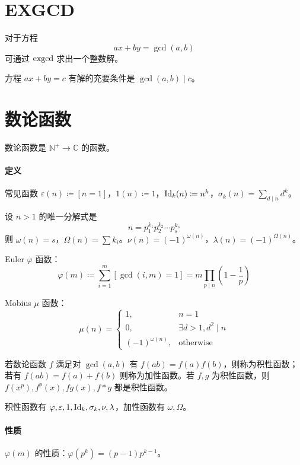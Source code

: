 \documentclass{probook}
\begin{document}
\begin{multicols}{2}


\section{EXGCD}

对于方程 
\[ax+by=\gcd(a,b)\]
可通过 $\rm exgcd$ 求出一个整数解。



方程 $ax+by=c$ 有解的充要条件是 $\gcd(a,b) \mid c$。



\section{数论函数}

数论函数是 $\mathbb{N}^+ \to \mathbb{C}$ 的函数。

\paragraph{定义}
常见函数 $\varepsilon(n) \coloneqq [n=1]$，$1(n) \coloneqq 1$，$\operatorname{Id}_k(n) \coloneqq n^k$，$\sigma_k(n) = \sum\limits_{d \mid n} d^k$。

设 $n > 1$ 的唯一分解式是
\[ n = p_1^{k_1}p_2^{k_2}\cdots p_s^{k_s} \]
则 $\omega(n) = s$，$\Omega(n) = \sum k_i$。$\nu(n) = (-1)^{\omega(n)}$，$\lambda(n) = (-1)^{\Omega(n)}$。

Euler $\varphi$ 函数：
\[ \varphi(m) \coloneqq \sum_{i=1}^m [\gcd(i,m) = 1] = m \prod_{p \mid n}\left( 1-\frac{1}{p} \right) \]

Mobius $\mu$ 函数：
\[ \mu(n) = \begin{cases}
    1, &n=1\\
    0, &\exists d > 1, d^2 \mid n\\
    (-1)^{\omega(n)}, &\text{otherwise}
\end{cases} \]

若数论函数 $f$ 满足对 $\gcd(a,b)$ 有 $f(ab) = f(a)f(b)$，则称为积性函数；若有 $f(ab) = f(a) + f(b)$ 则称为加性函数。若 $f,g$ 为积性函数，则 $f(x^p),f^p(x),fg(x),f \ast g$ 都是积性函数。

积性函数有 $\varphi,\varepsilon,1,\operatorname{Id}_k,\sigma_k,\nu,\lambda$，加性函数有 $\omega,\Omega$。

\paragraph{性质}
$\varphi(m)$ 的性质：$\varphi(p^k) = (p-1)p^{k-1}$。


\end{multicols}
\end{document}
